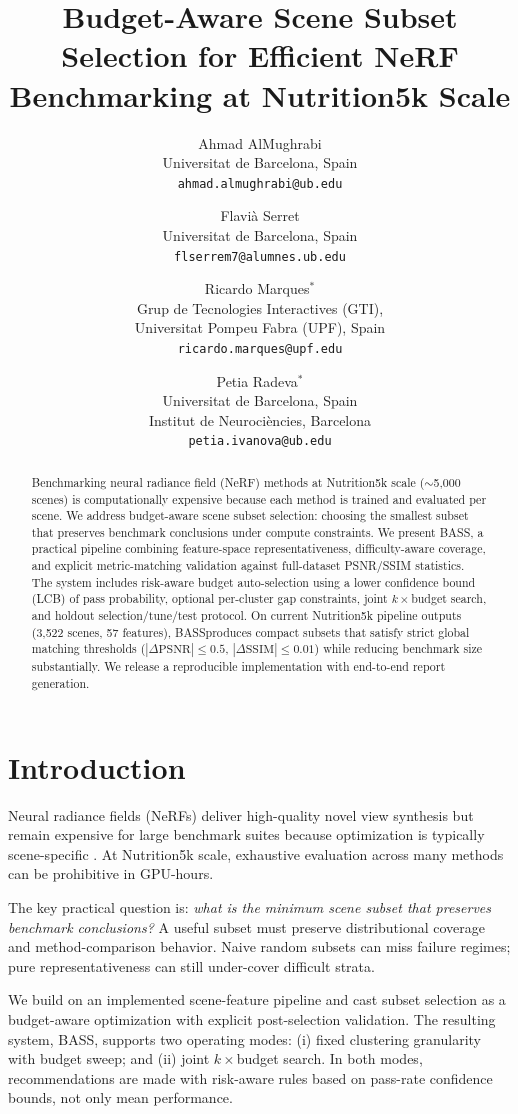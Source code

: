\documentclass[10pt,twocolumn,letterpaper]{article}
\title{Budget-Aware Scene Subset Selection for Efficient NeRF Benchmarking at Nutrition5k Scale}
\author{Ahmad AlMughrabi\\
Universitat de Barcelona, Spain\\
{\tt\small ahmad.almughrabi@ub.edu}
\and
Flavi\`a Serret\\
Universitat de Barcelona, Spain\\
{\tt\small flserrem7@alumnes.ub.edu}
\and
Ricardo Marques$^*$\\
Grup de Tecnologies Interactives (GTI),\\
Universitat Pompeu Fabra (UPF), Spain\\
{\tt\small ricardo.marques@upf.edu}
\and
Petia Radeva$^*$\\
Universitat de Barcelona, Spain\\
Institut de Neuroci\`encies, Barcelona\\
{\tt\small petia.ivanova@ub.edu}
}
\newcommand{\method}{\textsc{BASS}}
\begin{document}
\maketitle

\def\thefootnote{*}
\def\thefootnote{\arabic{footnote}}

\begin{abstract}
Benchmarking neural radiance field (NeRF) methods at Nutrition5k scale (\(\sim\)5,000 scenes) is computationally expensive because each method is trained and evaluated per scene. We address budget-aware scene subset selection: choosing the smallest subset that preserves benchmark conclusions under compute constraints. We present \method, a practical pipeline combining feature-space representativeness, difficulty-aware coverage, and explicit metric-matching validation against full-dataset PSNR/SSIM statistics. The system includes risk-aware budget auto-selection using a lower confidence bound (LCB) of pass probability, optional per-cluster gap constraints, joint \(k\times\)budget search, and holdout selection/tune/test protocol. On current Nutrition5k pipeline outputs (3,522 scenes, 57 features), \method produces compact subsets that satisfy strict global matching thresholds (\(|\Delta\text{PSNR}|\le 0.5\), \(|\Delta\text{SSIM}|\le 0.01\)) while reducing benchmark size substantially. We release a reproducible implementation with end-to-end report generation.
\end{abstract}

\section{Introduction}
Neural radiance fields (NeRFs) deliver high-quality novel view synthesis but remain expensive for large benchmark suites because optimization is typically scene-specific \cite{mildenhall2020nerf,barron2021mipnerf,muller2022instantngp}. At Nutrition5k scale, exhaustive evaluation across many methods can be prohibitive in GPU-hours.

The key practical question is: \emph{what is the minimum scene subset that preserves benchmark conclusions?} A useful subset must preserve distributional coverage and method-comparison behavior. Naive random subsets can miss failure regimes; pure representativeness can still under-cover difficult strata.

We build on an implemented scene-feature pipeline and cast subset selection as a budget-aware optimization with explicit post-selection validation. The resulting system, \method, supports two operating modes: (i) fixed clustering granularity with budget sweep; and (ii) joint \(k\times\)budget search. In both modes, recommendations are made with risk-aware rules based on pass-rate confidence bounds, not only mean performance.
\end{document}
